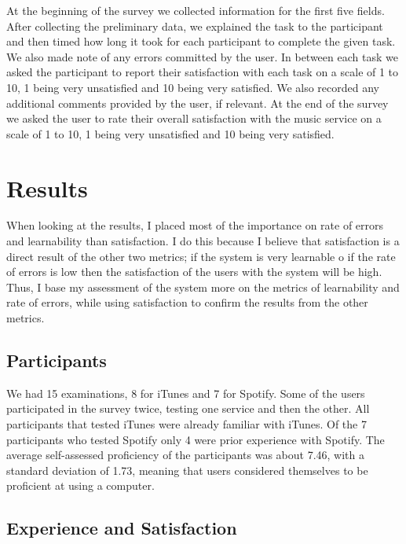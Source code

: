 \documentclass[11pt]{article}
\begin{document}
 
At the beginning of the survey we collected information for the first five fields. After collecting the preliminary data, we explained the task to the participant and then timed how long it took for each participant to complete the given task. We also made note of any errors committed by the user. In between each task we asked the participant to report their satisfaction with each task on a scale of 1 to 10, 1 being very unsatisfied and 10 being very satisfied. We also recorded any additional comments provided by the user, if relevant. At the end of the survey we asked the user to rate their overall satisfaction with the music service on a scale of 1 to 10, 1 being very unsatisfied and 10 being very satisfied.
\section{Results}
When looking at the results, I placed most of the importance on rate of errors and learnability than satisfaction. I do this because I believe that satisfaction is a direct result of the other two metrics; if the system is very learnable o if the rate of errors is low then the satisfaction of the users with the system will be high. Thus, I base my assessment of the system more on the metrics of learnability and rate of errors, while using satisfaction to confirm the results from the other metrics.
\subsection{Participants}
We had 15 examinations, 8 for iTunes and 7 for Spotify. Some of the users participated in the survey twice, testing one service and then the other.  All participants that tested iTunes were already familiar with iTunes. Of the 7 participants who tested Spotify only 4 were prior experience with Spotify. The average self-assessed proficiency of the participants was about 7.46, with a standard deviation of 1.73, meaning that users considered themselves to be proficient at using a computer. 


\subsection{Experience and Satisfaction}
\end{document}
